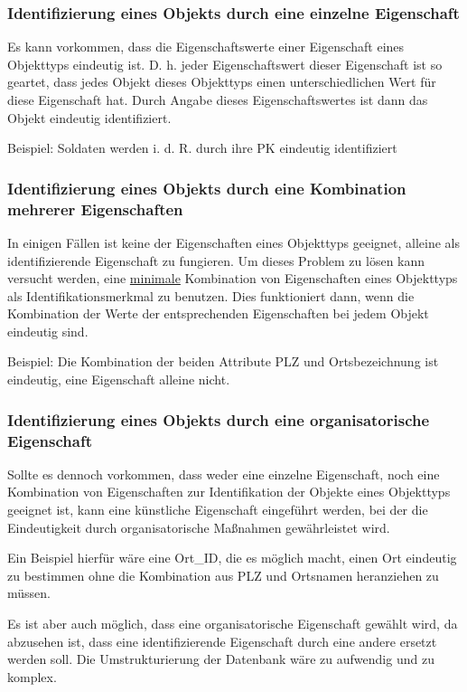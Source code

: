 \subsubsection{Identifizierung eines Objekts durch eine einzelne
    Eigenschaft}
Es kann vorkommen, dass die Eigenschaftswerte einer Eigenschaft eines
Objekttyps eindeutig ist. D. h. jeder Eigenschaftswert dieser
Eigenschaft ist so geartet, dass jedes Objekt dieses Objekttyps einen
unterschiedlichen Wert für diese Eigenschaft hat. Durch Angabe
dieses Eigenschaftswertes ist dann das Objekt eindeutig identifiziert.

Beispiel: Soldaten werden i. d. R. durch ihre PK eindeutig
identifiziert

\subsubsection{Identifizierung eines Objekts durch eine Kombination
    mehrerer Eigenschaften}
In einigen Fällen ist keine der Eigenschaften eines Objekttyps
geeignet, alleine als identifizierende Eigenschaft zu fungieren. Um
dieses Problem zu lösen kann versucht werden, eine
\underline{minimale} Kombination von Eigenschaften eines Objekttyps
als Identifikationsmerkmal zu benutzen. Dies funktioniert dann, wenn
die Kombination der Werte der entsprechenden Eigenschaften bei jedem
Objekt eindeutig sind.

Beispiel: Die Kombination der beiden Attribute PLZ und Ortsbezeichnung ist eindeutig,
eine Eigenschaft alleine nicht.

\subsubsection{Identifizierung eines Objekts durch eine organisatorische
    Eigenschaft}
Sollte es dennoch vorkommen, dass weder eine einzelne Eigenschaft, noch eine
Kombination von Eigenschaften zur Identifikation der Objekte eines
Objekttyps geeignet ist, kann eine künstliche Eigenschaft
eingeführt werden, bei der die Eindeutigkeit durch organisatorische
Maßnahmen gewährleistet wird.

Ein Beispiel hierfür wäre eine Ort\_ID, die es möglich
macht, einen Ort eindeutig zu bestimmen ohne die Kombination aus PLZ
und Ortsnamen heranziehen zu müssen.

Es ist aber auch möglich, dass eine organisatorische Eigenschaft
gewählt wird, da abzusehen ist, dass eine identifizierende
Eigenschaft durch eine andere ersetzt werden soll. Die
Umstrukturierung der Datenbank wäre zu aufwendig und zu komplex.

